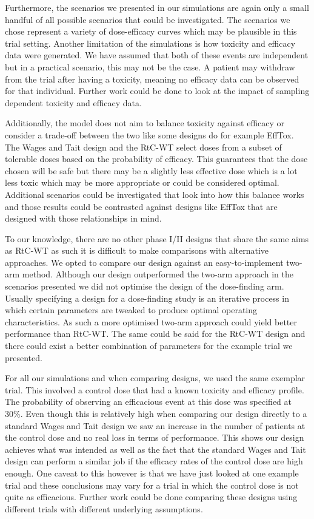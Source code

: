 Furthermore, the scenarios we presented in our simulations are again only a small handful of all possible scenarios that could be investigated. The scenarios we chose represent a variety of dose-efficacy curves which may be plausible in this trial setting. Another limitation of the simulations is how toxicity and efficacy data were generated. We have assumed that both of these events are independent but in a practical scenario, this may not be the case. A patient may withdraw from the trial after having a toxicity, meaning no efficacy data can be observed for that individual. Further work could be done to look at the impact of sampling dependent toxicity and efficacy data. 

Additionally, the model does not aim to balance toxicity against efficacy or consider a trade-off between the two like some designs do for example EffTox. The Wages and Tait design and the RtC-WT select doses from a subset of tolerable doses based on the probability of efficacy. This guarantees that the dose chosen will be safe but there may be a slightly less effective dose which is a lot less toxic which may be more appropriate or could be considered optimal. Additional scenarios could be investigated that look into how this balance works and those results could be contrasted against designs like EffTox that are designed with those relationships in mind.

To our knowledge, there are no other phase \RN{1}/\RN{2} designs that share the same aims as RtC-WT as such it is difficult to make comparisons with alternative approaches. We opted to compare our design against an easy-to-implement two-arm method. Although our design outperformed the two-arm approach in the scenarios presented we did not optimise the design of the dose-finding arm. Usually specifying a design for a dose-finding study is an iterative process in which certain parameters are tweaked to produce optimal operating characteristics. As such a more optimised two-arm approach could yield better performance than RtC-WT. The same could be said for the RtC-WT design and there could exist a better combination of parameters for the example trial we presented. 

For all our simulations and when comparing designs, we used the same exemplar trial. This involved a control dose that had a known toxicity and efficacy profile. The probability of observing an efficacious event at this dose was specified at 30\%. Even though this is relatively high when comparing our design directly to a standard Wages and Tait design we saw an increase in the number of patients at the control dose and no real loss in terms of performance. This shows our design achieves what was intended as well as the fact that the standard Wages and Tait design can perform a similar job if the efficacy rates of the control dose are high enough. One caveat to this however is that we have just looked at one example trial and these conclusions may vary for a trial in which the control dose is not quite as efficacious. Further work could be done comparing these designs using different trials with different underlying assumptions. 

